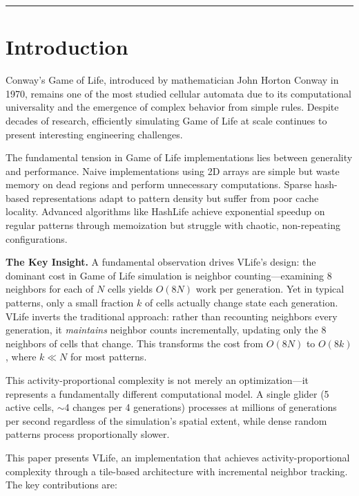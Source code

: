 \documentclass[11pt]{article}
\theoremstyle{definition}
\begin{document}
    \vspace{1em}
    \hrule
    \vspace{2em}

    \section{Introduction}

    Conway's Game of Life, introduced by mathematician John Horton Conway in 1970, remains one of the most studied cellular automata due to its computational universality and the emergence of complex behavior from simple rules. Despite decades of research, efficiently simulating Game of Life at scale continues to present interesting engineering challenges.

    The fundamental tension in Game of Life implementations lies between generality and performance. Naive implementations using 2D arrays are simple but waste memory on dead regions and perform unnecessary computations. Sparse hash-based representations adapt to pattern density but suffer from poor cache locality. Advanced algorithms like HashLife achieve exponential speedup on regular patterns through memoization but struggle with chaotic, non-repeating configurations.

    \textbf{The Key Insight.} A fundamental observation drives VLife's design: the dominant cost in Game of Life simulation is neighbor counting---examining 8 neighbors for each of $N$ cells yields $O(8N)$ work per generation. Yet in typical patterns, only a small fraction $k$ of cells actually change state each generation. VLife inverts the traditional approach: rather than recounting neighbors every generation, it \emph{maintains} neighbor counts incrementally, updating only the 8 neighbors of cells that change. This transforms the cost from $O(8N)$ to $O(8k)$, where $k \ll N$ for most patterns.

    This activity-proportional complexity is not merely an optimization---it represents a fundamentally different computational model. A single glider (5 active cells, $\sim$4 changes per 4 generations) processes at millions of generations per second regardless of the simulation's spatial extent, while dense random patterns process proportionally slower.

    This paper presents VLife, an implementation that achieves activity-proportional complexity through a tile-based architecture with incremental neighbor tracking. The key contributions are:
\end{document}
